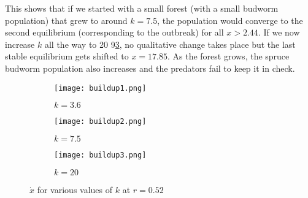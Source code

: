 \documentclass{article}
\begin{document}
This shows that if we started with a small forest (with a small budworm population) that grew to around $k=7.5$, the population would converge to the second equilibrium (corresponding to the outbreak) for all $x>2.44$. If we now increase $k$ all the way to 20 9\ref{fig:b3}, no qualitative change takes place but the last stable equilibrium gets shifted to $x=17.85$. As the forest grows, the spruce budworm population also increases and the predators fail to keep it in check.
\begin{figure}[H]
     \centering
     \begin{subfigure}[b]{0.3\textwidth}
         \centering
         \texttt{[image: buildup1.png]}
         \caption{$k=3.6$}
         \label{fig:b1}
     \end{subfigure}
     \hfill
     \begin{subfigure}[b]{0.3\textwidth}
         \centering
         \texttt{[image: buildup2.png]}
         \caption{$k=7.5$}
         \label{fig:b2}
     \end{subfigure}
     \hfill
          \begin{subfigure}[b]{0.3\textwidth}
         \centering
         \texttt{[image: buildup3.png]}
         \caption{$k=20$}
         \label{fig:b3}
     \end{subfigure}
        \caption{$\dot{x}$ for various values of $k$ at $r=0.52$}
        \label{fig:buildup}
\end{figure}
\end{document}
